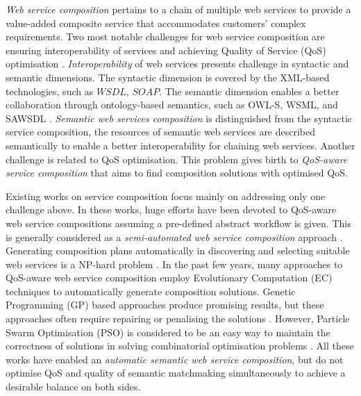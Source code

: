 \documentclass{llncs}
\begin{document}
\textit{Web service composition} pertains to a chain of multiple web services to provide a value-added composite service that accommodates customers' complex requirements. 
Two most notable challenges for web service composition are ensuring interoperability of services and achieving Quality of Service (QoS) optimisation \cite{fensel2011semantic}. \textit{Interoperability} of web services presents challenge in syntactic and semantic dimensions. The syntactic dimension is covered by the XML-based technologies, such as $WSDL$, $SOAP$. The semantic dimension enables a better collaboration through ontology-based semantics, such as OWL-S, WSML, and SAWSDL \cite{petrie2016web}. \textit{Semantic web services composition} is distinguished from the syntactic service composition, the resources of semantic web services are described semantically to enable a better interoperability for chaining web services. Another challenge is related to QoS optimisation. This problem gives birth to \textit{QoS-aware service composition} that aims to find composition solutions with optimised QoS.

Existing works on service composition focus mainly on addressing only one challenge above. In these works, huge efforts have been devoted to QoS-aware web service compositions assuming a pre-defined abstract workflow is given. This is generally considered as a \textit{semi-automated web service composition} approach \cite{parejo2008qos}. Generating composition plans automatically in discovering and selecting suitable web services is a NP-hard problem \cite{moghaddam2014service}. In the past few years, many approaches \cite{gupta2015optimization,ma2015hybrid,qi2010combining,da2016particle,da2015graphevol,yu2013adaptive} to QoS-aware web service composition employ Evolutionary Computation (EC) techniques to automatically generate composition solutions. Genetic Programming (GP) based approaches produce promising results, but these approaches often require repairing or penalising the solutions \cite{ma2015hybrid,yu2013adaptive}. However, Particle Swarm Optimisation (PSO) is considered to be an easy way to maintain the correctness of solutions in solving combinatorial optimisation problems \cite{da2016particle}. All these works have enabled an \textit{automatic semantic web service composition}, but do not optimise QoS and quality of semantic matchmaking simultaneously to achieve a desirable balance on both sides.  
\end{document}

